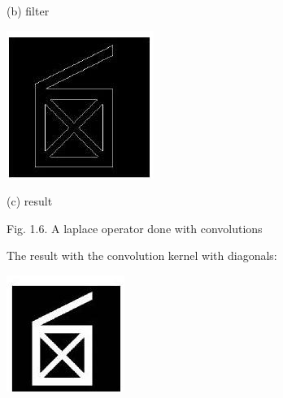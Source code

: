 \documentclass[10pt]{article}
\begin{document}
(b) filter

\includegraphics[max width=\textwidth]{2022_01_06_b5ce182ed1bd5f482e5bg-12(3)}

(c) result

Fig. 1.6. A laplace operator done with convolutions

The result with the convolution kernel with diagonals:

\includegraphics[max width=\textwidth]{2022_01_06_b5ce182ed1bd5f482e5bg-13}
\end{document}
